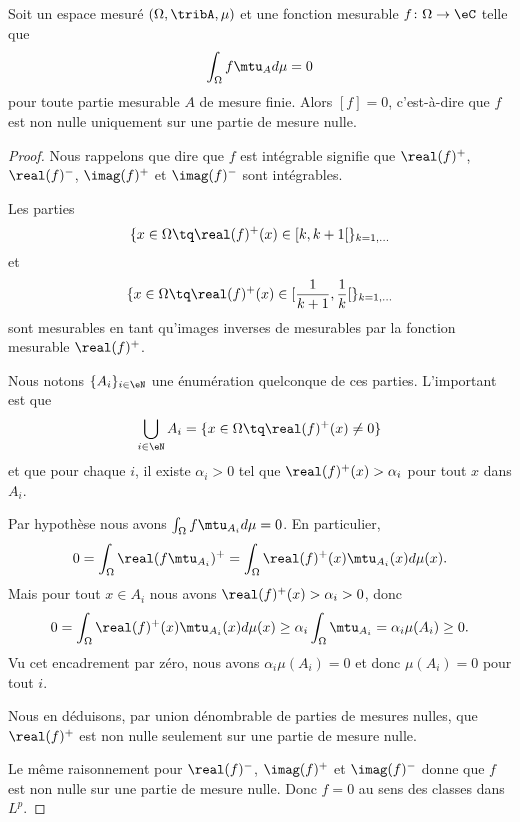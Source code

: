 \begin{proposition} \label{PropRERZooYcEchc}
	Soit un espace mesuré \( (\Omega,\tribA,\mu)\) et une fonction mesurable \( f\colon \Omega\to \eC \) telle que
	\begin{equation}
		\int_{\Omega}f\mtu_Ad\mu=0
	\end{equation}
	pour toute partie mesurable \( A\) de mesure finie. Alors \( [f]=0\), c'est-à-dire que \( f\) est non nulle uniquement sur une partie de mesure nulle.
\end{proposition}

\begin{proof}
	Nous rappelons que dire que \( f\) est intégrable signifie que \( \real(f)^+\), \( \real(f)^-\), \( \imag(f)^+\) et \( \imag(f)^-\) sont intégrables.

	Les parties
	\begin{equation}
		\{ x\in \Omega \tq \real(f)^+(x)\in \mathopen[ k , k+1 \mathclose[ \}_{k=1,\ldots}
	\end{equation}
	et
	\begin{equation}
		\{ x\in \Omega \tq \real(f)^+(x)\in \mathopen[ \frac{1}{ k+1 } , \frac{1}{ k } \mathclose[ \}_{k=1,\ldots}
	\end{equation}
	sont mesurables en tant qu'images inverses de mesurables par la fonction mesurable \( \real(f)^+\).

	Nous notons \( \{ A_i \}_{i\in \eN}\) une énumération quelconque de ces parties. L'important est que
	\begin{equation}
		\bigcup_{i\in \eN}A_i=\{ x\in \Omega\tq \real(f)^+(x)\neq 0 \}
	\end{equation}
	et que pour chaque \( i\), il existe \( \alpha_i>0\) tel que \( \real(f)^+(x)>\alpha_i\) pour tout \( x\) dans \( A_i\).

	Par hypothèse nous avons \( \int_{\Omega}f\mtu_{A_i}d\mu=0\). En particulier,
	\begin{equation}
		0=\int_{\Omega}\real(f\mtu_{A_i})^+=\int_{\Omega}\real(f)^+(x)\mtu_{A_i}(x)d\mu(x).
	\end{equation}
	Mais pour tout \( x\in A_i\) nous avons \( \real(f)^+(x)>\alpha_i>0\), donc
	\begin{equation}
		0=\int_{\Omega}\real(f)^+(x)\mtu_{A_i}(x)d\mu(x)\geq \alpha_i\int_{\Omega}\mtu_{A_i}=\alpha_i\mu(A_i)\geq 0.
	\end{equation}
	Vu cet encadrement par zéro, nous avons \( \alpha_i\mu(A_i)=0\) et donc \( \mu(A_i)=0\) pour tout \( i\).

	Nous en déduisons, par union dénombrable de parties de mesures nulles, que \( \real(f)^+\) est non nulle seulement sur une partie de mesure nulle.

	Le même raisonnement pour \( \real(f)^-\), \( \imag(f)^+\) et \( \imag(f)^-\) donne que \( f\) est non nulle sur une partie de mesure nulle. Donc \( f=0\) au sens des classes dans \( L^p\).
\end{proof}

